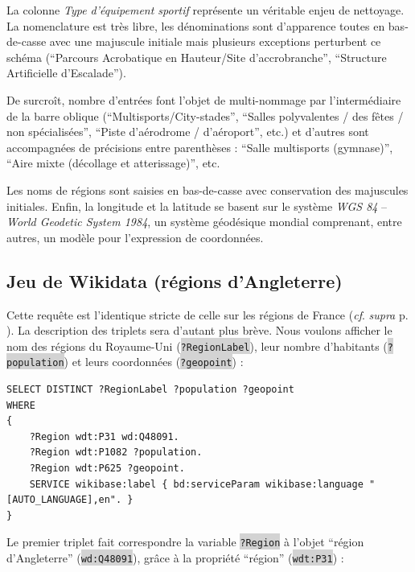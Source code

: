 \documentclass[hidelinks, 12pt]{report}
\newcommand{\code}[1]{\colorbox{LightGray}{\texttt{#1}}}
\begin{document}
La colonne \textit{Type d'équipement sportif} représente un véritable enjeu de nettoyage. La nomenclature est très libre, les dénominations sont d'apparence toutes en bas-de-casse avec une majuscule initiale mais plusieurs exceptions perturbent ce schéma (\enquote{Parcours Acrobatique en Hauteur/Site d'accrobranche}, \enquote{Structure Artificielle d'Escalade}).

De surcroît, nombre d'entrées font l'objet de multi-nommage par l'intermédiaire de la barre oblique (\enquote{Multisports/City-stades}, \enquote{Salles polyvalentes / des fêtes / non spécialisées}, \enquote{Piste d’aérodrome / d'aéroport}, etc.) et d'autres sont accompagnées de précisions entre parenthèses : \enquote{Salle multisports (gymnase)}, \enquote{Aire mixte (décollage et atterissage)}, etc.

Les noms de régions sont saisies en bas-de-casse avec conservation des majuscules initiales. Enfin, la longitude et la latitude se basent sur le système \textit{WGS 84} -- \textit{World Geodetic System 1984}, un système géodésique mondial comprenant, entre autres, un modèle pour l'expression de coordonnées.





%





\subsection{Jeu de Wikidata (régions d'Angleterre)}

\label{queryeng}Cette requête est l'identique stricte de celle sur les régions de France (\textit{cf}. \textit{supra} p. \pageref{queryfr}). La description des triplets sera d'autant plus brève. Nous voulons afficher le nom des régions du Royaume-Uni (\code{?RegionLabel}), leur nombre d'habitants (\code{?population}) et leurs coordonnées (\code{?geopoint}) :

\begin{lstlisting}[language=SPARQL]
SELECT DISTINCT ?RegionLabel ?population ?geopoint
WHERE
{
	?Region wdt:P31 wd:Q48091.
	?Region wdt:P1082 ?population.
	?Region wdt:P625 ?geopoint.
	SERVICE wikibase:label { bd:serviceParam wikibase:language "[AUTO_LANGUAGE],en". }
}
\end{lstlisting}

Le premier triplet fait correspondre la variable \code{?Region} à l'objet \enquote{région d'Angleterre} (\code{wd:Q48091}), grâce à la propriété \enquote{région} (\code{wdt:P31}) :
\end{document}
